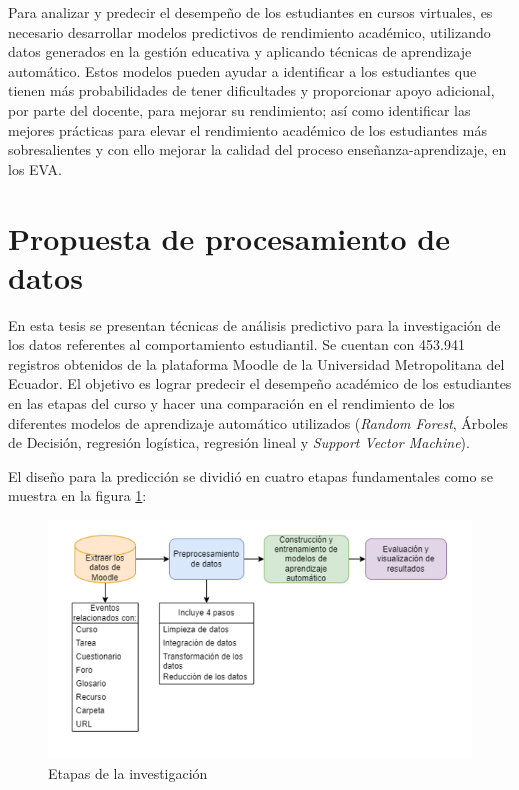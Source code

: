  
Para analizar y predecir el desempeño de los estudiantes en cursos virtuales, es necesario desarrollar modelos predictivos de rendimiento académico, utilizando datos generados en la gestión educativa y aplicando técnicas de aprendizaje automático. Estos modelos pueden ayudar a identificar a los estudiantes que tienen más probabilidades de tener dificultades y proporcionar apoyo adicional, por parte del docente, para mejorar su rendimiento; así como identificar las mejores prácticas para elevar el rendimiento académico de los estudiantes más sobresalientes y con ello mejorar la calidad del proceso enseñanza-aprendizaje, en los EVA.  

\section{Propuesta de procesamiento de datos}

En esta tesis se presentan técnicas de análisis predictivo para la investigación de los datos referentes al comportamiento estudiantil. Se cuentan con 453.941 registros obtenidos de la plataforma Moodle de la Universidad Metropolitana del Ecuador. El objetivo es lograr predecir el desempeño académico de los estudiantes en las etapas del curso y hacer una comparación en el rendimiento de los diferentes modelos de aprendizaje automático utilizados (\textit{Random Forest}, Árboles de Decisión, regresión logística, regresión lineal y \textit{Support Vector Machine}).   


El diseño para la predicción se dividió en cuatro etapas fundamentales como se muestra en la figura \ref{Etapas}:
\begin{figure}[htb]
    \centering
    \includegraphics[width = 1 \textwidth]{Graphics/Pasted image 20240103010810.png}
    \caption{Etapas de la investigación}
    \label{Etapas}
\end{figure}


